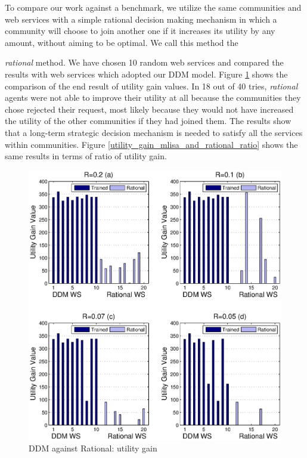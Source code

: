 To compare our work against a benchmark, we utilize the same communities and web services with a simple rational decision making mechanism in which a community will choose to join another one if it increases its utility by any amount, without aiming to be optimal. We call this method the {\textit{rational} method. We have chosen 10 random web services and compared the results with web services which adopted our DDM model. Figure \ref{utility_gain_mlisa_and_rational} shows the comparison of the end result of utility gain values. In 18 out of 40 tries, \emph{rational} agents were not able to improve their utility at all because the communities they chose rejected their request, most likely because they would not have increased the utility of the other communities if they had joined them. The results show that a long-term strategic decision mechanism is needed to satisfy all the services within communities. Figure \ref{utility_gain_mlisa_and_rational_ratio} shows the same results in terms of ratio of utility gain.

\begin{figure}%
\centering
\includegraphics[width=5in]{figures/utility_gain.eps}
\caption{DDM against Rational: utility gain }
\label{utility_gain_mlisa_and_rational}
\end{figure}

}
